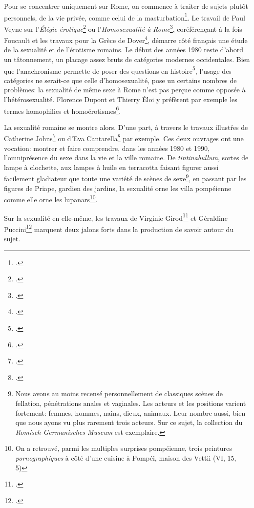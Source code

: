 Pour se concentrer uniquement sur Rome, on commence à traiter de sujets plutôt personnels, de la vie privée, comme celui de la masturbation\footcite{krenkel_masturbation_1979}. Le travail de Paul Veyne sur l'\textit{Élégie érotique}\footcite{veyne_lelegie_1983} ou l'\textit{Homosexualité à Rome}\footcite{veyne_homosexualite_1982}, coréférençant à la fois Foucault et les travaux pour la Grèce de Dover\footcite{dover_greek_1979}, démarre côté français une étude de la sexualité et de l'érotisme romains. Le début des années 1980 reste d'abord un tâtonnement, un placage assez bruts de catégories modernes occidentales. Bien que l'anachronisme permette de poser des questions en histoire\footcite{loraux_eloge_2005}, l'usage des catégories ne serait-ce que celle d'homosexualité, pose un certains nombres de problèmes: la sexualité de même sexe à Rome n'est pas perçue comme opposée à l'hétérosexualité. Florence Dupont et Thierry Éloi y préfèrent par exemple les termes homophilies et homoérotismes\footcite{dupont_antiquite_2013}.

La sexualité romaine se montre alors. D'une part, à travers le travaux illustŕes de Catherine Johns\footcite{johns2000sex} ou d'Eva Cantarella\footcite{cantarella_pompei_2000} par exemple. Ces deux ouvrages ont une vocation: montrer et faire comprendre, dans les années 1980 et 1990, l'omniprésence du sexe dans la vie et la ville romaine. De \textit{tintinabullum}, sortes de lampe à clochette, aux lampes à huile en terracotta faisant figurer aussi facilement gladiateur que toute une variété de scènes de sexe\footnote{Nous avons au moins recensé personnellement de classiques scènes de fellation, pénétrations anales et vaginales. Les acteurs et les positions varient fortement: femmes, hommes, nains, dieux, animaux. Leur nombre aussi, bien que nous ayons vu plus rarement trois acteurs. Sur ce sujet, la collection du \textit{Romisch-Germanisches Museum} est exemplaire.}, en passant par les figures de Priape, gardien des jardins, la sexualité orne les villa pompéienne comme elle orne les lupanars\footnote{On a retrouvé, parmi les multiples surprises pompéienne, trois peintures \textit{pornographiques} à côté d'une cuisine à Pompéi, maison des Vettii (VI, 15, 5)\textcite[p.~75]{cantarella}}.



Sur la sexualité en elle-même, les travaux de Virginie Girod\footcite{girod_les_2017} et Géraldine Puccini\footcite{puccini_delbey_vie_2010} marquent deux jalons forts dans la production de savoir autour du sujet.

